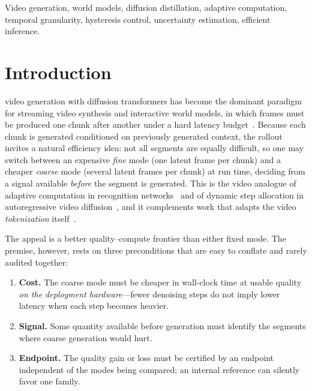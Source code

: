 \documentclass[journal]{IEEEtran}
\begin{document}
\begin{IEEEkeywords}
Video generation, world models, diffusion distillation, adaptive computation, temporal granularity, hysteresis control, uncertainty estimation, efficient inference.
\end{IEEEkeywords}

\section{Introduction}
 video generation with diffusion transformers has become the dominant paradigm for streaming video synthesis and interactive world models, in which frames must be produced one chunk after another under a hard latency budget~\cite{zhengCausalrCMUnifiedTeacherForcing2026,huangSelfForcingBridging2025,zhuCausalForcingAutoregressive2026a,zhaoCausalForcingScalable2026a,aiMAGI1AutoregressiveVideo2025,zhaoMinWMFullStackOpenSource2026a}. Because each chunk is generated conditioned on previously generated context, the rollout invites a natural efficiency idea: not all segments are equally difficult, so one may switch between an expensive \emph{fine} mode (one latent frame per chunk) and a cheaper \emph{coarse} mode (several latent frames per chunk) at run time, deciding from a signal available \emph{before} the segment is generated. This is the video analogue of adaptive computation in recognition networks~\cite{gravesAdaptiveComputationTime2017,teerapittayanonBranchyNetFastInference2017,wangSkipNetLearningDynamic2018} and of dynamic step allocation in autoregressive video diffusion~\cite{leDSADynamicStep2026}, and it complements work that adapts the video \emph{tokenization} itself~\cite{liLearningAdaptiveTemporally2025,xiongEVATokAdaptiveLength2026,yuanDLFRVAEDynamicLatent2025,zhongVFRTokVariableFrame2025}.

The appeal is a better quality--compute frontier than either fixed mode. The premise, however, rests on three preconditions that are easy to conflate and rarely audited together:
\begin{enumerate}
\item[(P1)] \textbf{Cost.} The coarse mode must be cheaper in wall-clock time at usable quality \emph{on the deployment hardware}---fewer denoising steps do not imply lower latency when each step becomes heavier.
\item[(P2)] \textbf{Signal.} Some quantity available before generation must identify the segments where coarse generation would hurt.
\item[(P3)] \textbf{Endpoint.} The quality gain or loss must be certified by an endpoint independent of the modes being compared; an internal reference can silently favor one family.
\end{enumerate}
\end{document}
